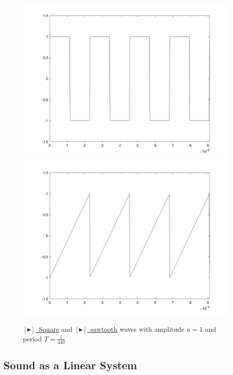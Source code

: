 \begin{figure}[h]
    \centering
    \includegraphics[scale=.15]{square_A4.png}
    \includegraphics[scale=.15]{sawtooth_A4.png}
    \caption{\href{https://drive.google.com/file/d/1258wPS87kcBCvN_tSSiJX62L3gxTmrCi/view?usp=sharing}{\color{blue} $[\blacktriangleright]$~Square} and \href{https://drive.google.com/file/d/12ifgK4XE0z8f6byHCA4ULdHENxMqbqqZ/view?usp=sharing}{\color{blue} $[\blacktriangleright]$~sawtooth} waves with amplitude $a = 1$ and period $T = \frac{1}{440}$}
    \label{fig:square_sawtooth}
\end{figure}

\subsection{Sound as a Linear System}

